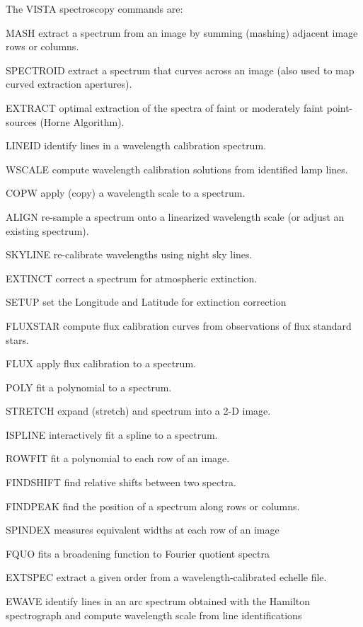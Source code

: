 The VISTA spectroscopy commands are:
\begin{example}
  \item[MASH\hfill]{extract a spectrum from an image by summing (mashing)
       adjacent image rows or columns.}
  \item[SPECTROID\hfill]{extract a spectrum that curves across an image 
       (also used to map curved extraction apertures).}
  \item[EXTRACT\hfill]{optimal extraction of the spectra of faint or
       moderately faint point-sources (Horne Algorithm).}
  \item[LINEID\hfill]{identify lines in a wavelength calibration spectrum.}
  \item[WSCALE\hfill]{compute wavelength calibration solutions from
       identified lamp lines.}
  \item[COPW\hfill]{apply (copy) a wavelength scale to a spectrum.}
  \item[ALIGN\hfill]{re-sample a spectrum onto a linearized wavelength
       scale (or adjust an existing spectrum).}
  \item[SKYLINE\hfill]{re-calibrate wavelengths using night sky lines.}
  \item[EXTINCT\hfill]{correct a spectrum for atmospheric extinction.}
  \item[SETUP\hfill]{set the Longitude and Latitude for extinction correction}
  \item[FLUXSTAR\hfill]{compute flux calibration curves from observations 
       of flux standard stars.}
  \item[FLUX\hfill]{apply flux calibration to a spectrum.}
  \item[POLY\hfill]{fit a polynomial to a spectrum.}
  \item[STRETCH\hfill]{expand (stretch) and spectrum into a 2-D image.}
  \item[ISPLINE\hfill]{interactively fit a spline to a spectrum.}
  \item[ROWFIT\hfill]{fit a polynomial to each row of an image.}
  \item[FINDSHIFT\hfill]{find relative shifts between two spectra.}
  \item[FINDPEAK\hfill]{find the position of a spectrum along rows or 
       columns.}
  \item[SPINDEX\hfill]{measures equivalent widths at each row of an image}
  \item[FQUO\hfill]{fits a broadening function to Fourier quotient spectra}
  \item[EXTSPEC\hfill]{extract a given order from a wavelength-calibrated
       echelle file.}
  \item[EWAVE\hfill]{identify lines in an arc spectrum obtained with the
        Hamilton spectrograph and compute wavelength scale from line
        identifications}
\end{example}


